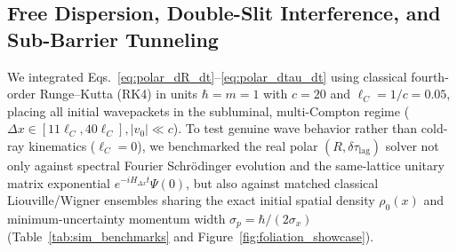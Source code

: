 \documentclass[11pt, a4paper]{article}
\theoremstyle{definition}
\begin{document}
\subsection{Free Dispersion, Double-Slit Interference, and Sub-Barrier Tunneling}
\label{sec:subluminal_benchmarks}

We integrated Eqs.~\eqref{eq:polar_dR_dt}--\eqref{eq:polar_dtau_dt} using classical fourth-order Runge--Kutta (RK4) in units $\hbar = m = 1$ with $c = 20$ and $\ell_C = 1/c = 0.05$, placing all initial wavepackets in the subluminal, multi-Compton regime ($\Delta x \in [11\ell_C, 40\ell_C], |v_0| \ll c$). To test genuine wave behavior rather than cold-ray kinematics ($\ell_C = 0$), we benchmarked the real polar $(R, \delta\tau_{\text{lag}})$ solver not only against spectral Fourier Schr\"{o}dinger evolution and the same-lattice unitary matrix exponential $e^{-i H_{\Delta x} t}\Psi(0)$, but also against matched classical Liouville/Wigner ensembles sharing the exact initial spatial density $\rho_0(x)$ and minimum-uncertainty momentum width $\sigma_p = \hbar/(2\sigma_x)$ (Table~\ref{tab:sim_benchmarks} and Figure~\ref{fig:foliation_showcase}).
\end{document}
